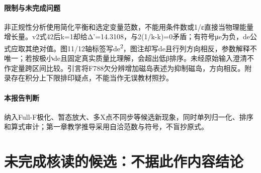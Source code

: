 \paragraph{限制与未完成问题}非正规性分析使用简化平衡和选定变量范数，不能用条件数或1/ε直接当物理能量增长量。v2式42后k=1却给Δ'=14.3108，与2(1/k-k)=0矛盾；有符号μe为负，de公式应取其绝对值。图11/12轴标签写de\textsuperscript{2}，图注却写de且行列方向相反，参数解释不唯一；若按极小de且固定真实质量比理解，会超出低β排序。未经原始输入澄清不作定量跨区间比较。引言将F788欠分辨增加磁岛表述为抑制磁岛，方向相反。附录存在积分上下限排印疑点，不能当作无误教材照抄。

\paragraph{本报告判断}纳入Full-F极化、暂态放大、多X点不同步等候选新现象，同时单列归一化、排序和算式审计；第一章教学推导采用自洽范数与符号，不盲抄原式。


\section{未完成核读的候选：不据此作内容结论}

